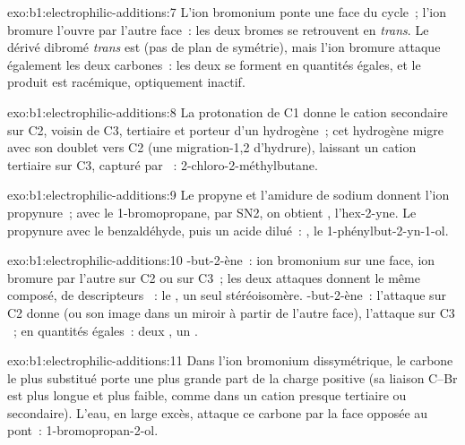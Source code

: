 \begin{solution}{exo:b1:electrophilic-additions:7}
L'ion bromonium ponte une face du cycle~; l'ion bromure l'ouvre par
l'autre face~: les deux bromes se retrouvent en \textit{trans}. Le
dérivé dibromé \textit{trans} est  (pas de plan de symétrie), mais
l'ion bromure attaque également les deux carbones~: les deux
 se forment en quantités égales, et le produit est racémique,
optiquement inactif.
\end{solution}

\begin{solution}{exo:b1:electrophilic-additions:8}
La protonation de C1 donne le cation secondaire sur C2, voisin de C3,
tertiaire et porteur d'un hydrogène~; cet hydrogène migre avec son
doublet vers C2 (une migration-1,2 d'hydrure), laissant un cation
tertiaire sur C3, capturé par
~: 2-chloro-2-méthylbutane.
\end{solution}

\begin{solution}{exo:b1:electrophilic-additions:9}
Le propyne et l'amidure de sodium donnent l'ion propynure~; avec le
1-bromopropane, par SN2, on obtient
, l'hex-2-yne. Le propynure avec le benzaldéhyde,
puis un acide dilué~:
, le 1-phénylbut-2-yn-1-ol.
\end{solution}

\begin{solution}{exo:b1:electrophilic-additions:10}
-but-2-ène~: ion bromonium sur une face, ion bromure par l'autre
sur C2 ou sur C3~; les deux attaques donnent le même composé, de
descripteurs ~:
le , un seul stéréoisomère. -but-2-ène~: l'attaque
sur C2 donne  (ou son image dans un miroir à partir de
l'autre face), l'attaque sur C3
~; en quantités égales~: deux , un .
\end{solution}

\begin{solution}{exo:b1:electrophilic-additions:11}
Dans l'ion bromonium dissymétrique, le carbone le plus substitué porte
une plus grande part de la charge positive (sa liaison C--Br est plus
longue et plus faible, comme dans un cation presque tertiaire ou
secondaire). L'eau, en large excès, attaque ce carbone par la face
opposée au pont~: 1-bromopropan-2-ol.
\end{solution}

